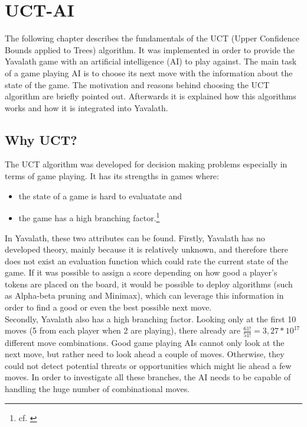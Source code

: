 \documentclass[german]{report}
\begin{document}
\section{UCT-AI}
\label{sec:chapter4}
The following chapter describes the fundamentals of the UCT (Upper Confidence
Bounds applied to Trees) algorithm. It was implemented in order to provide the
Yavalath game with an artificial intelligence (AI) to play against. The main
task of a game playing AI is to choose its next move with the information about
the state of the game. The motivation and reasons behind choosing the UCT
algorithm are briefly pointed out. Afterwards it is explained how this
algorithms works and how it is integrated into Yavalath.

\subsection{Why UCT?}
The UCT algorithm was developed for decision making problems especially in terms
of game playing. It has its strengths in games where:
\begin{itemize}
	\item the state of a game is hard to evaluatate and
	\item the game has a high branching factor.\footnote{cf. \cite{wiki:mcts}}
\end{itemize}

In Yavalath, these two attributes can be found. Firstly, Yavalath has no
developed theory, mainly because it is relatively unknown, and therefore there
does not exist an evaluation function which could rate the current state of the
game. If it was possible to assign a score depending on how good a player's
tokens are placed on the board, it would be possible to deploy algorithms (such
as Alpha-beta pruning and Minimax), which can leverage this information in order
to find a good or even the best possible next move.\\

Secondly, Yavalath also has a high branching factor. Looking only at the first
10 moves (5 from each player when 2 are playing), there already are
\(\frac{61!}{51!}=3,27*10^{17}\) different move combinations. Good game playing
AIs cannot only look at the next move, but rather need to look ahead a couple of
moves. Otherwise, they could not detect potential threats or opportunities which
might lie ahead a few moves. In order to investigate all these branches, the AI
needs to be capable of handling the huge number of combinational moves.\\
\end{document}
